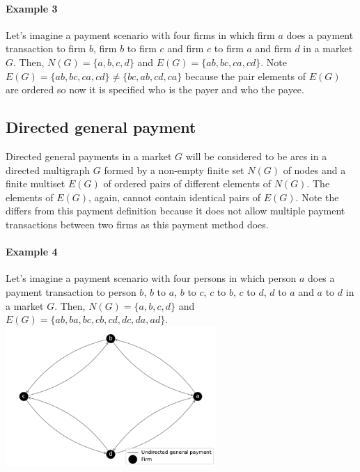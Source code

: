 \documentclass[12pt]{article}
\begin{document}
\begin{multicols}{2}
\clearpage
\begin{mdframed}
\paragraph{Example 3} \label{ex3}
Let's imagine a payment scenario with four firms in which firm $a$ does a payment transaction to firm $b$, firm $b$ to firm $c$ and firm $c$ to firm $a$ and firm $d$ in a market $G$. Then, $N(G) = \{a, b, c, d\}$ and $E(G) = \{ab, bc, ca, cd\}$. Note $E(G) = \{ab, bc, ca, cd\} \neq \{bc, ab, cd, ca\}$ because the pair elements of $E(G)$ are ordered so now it is specified who is the payer and who the payee.
\end{mdframed}
\subsection{Directed general payment} \label{dgp}
Directed general payments in a market $G$ will be considered to be arcs in a directed multigraph $G$ formed by a non-empty finite set $N(G)$ of nodes and a finite multiset $E(G)$ of ordered pairs of different elements of $N(G)$. The elements of $E(G)$, again, cannot contain identical pairs of $E(G)$. Note the  differs from this payment definition because it does not allow multiple payment transactions between two firms as this payment method does.

\begin{mdframed}
\paragraph{Example 4} \label{ex4}
Let's imagine a payment scenario with four persons in which person $a$ does a payment transaction to person $b$, $b$ to $a$, $b$ to $c$, $c$ to $b$, $c$ to $d$, $d$ to $a$ and $a$ to $d$ in a market $G$. Then, $N(G) = \{a, b, c, d\}$ and $E(G) = \{ab, ba, bc, cb, cd, dc, da, ad\}$.
{
 \includegraphics[width=8cm]{figures/F2.pdf}
 \vspace{0.5cm}
}
\end{mdframed}


\end{multicols}
\end{document}
